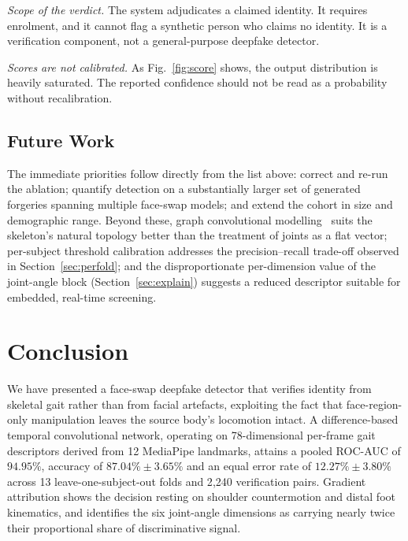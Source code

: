 \documentclass[journal]{IEEEtran}
\begin{document}
\emph{Scope of the verdict.} The system adjudicates a claimed identity. It
requires enrolment, and it cannot flag a synthetic person who claims no
identity. It is a verification component, not a general-purpose deepfake
detector.

\emph{Scores are not calibrated.} As Fig.~\ref{fig:score} shows, the output
distribution is heavily saturated. The reported confidence should not be read
as a probability without recalibration.

\subsection{Future Work}

The immediate priorities follow directly from the list above: correct and re-run
the ablation; quantify detection on a substantially larger set of generated
forgeries spanning multiple face-swap models; and extend the cohort in size and
demographic range. Beyond these, graph convolutional
modelling~\cite{gaitgraph} suits the skeleton's natural topology better than
the treatment of joints as a flat vector; per-subject threshold calibration
addresses the precision--recall trade-off observed in
Section~\ref{sec:perfold}; and the disproportionate per-dimension value of the
joint-angle block (Section~\ref{sec:explain}) suggests a reduced descriptor
suitable for embedded, real-time screening.

\section{Conclusion}
\label{sec:conclusion}

We have presented a face-swap deepfake detector that verifies identity from
skeletal gait rather than from facial artefacts, exploiting the fact that
face-region-only manipulation leaves the source body's locomotion intact. A
difference-based temporal convolutional network, operating on 78-dimensional
per-frame gait descriptors derived from 12 MediaPipe landmarks, attains a
pooled ROC-AUC of $94.95\%$, accuracy of $87.04\% \pm 3.65\%$ and an equal
error rate of $12.27\% \pm 3.80\%$ across 13 leave-one-subject-out folds and
2{,}240 verification pairs. Gradient attribution shows the decision resting on
shoulder countermotion and distal foot kinematics, and identifies the six
joint-angle dimensions as carrying nearly twice their proportional share of
discriminative signal.
\end{document}
